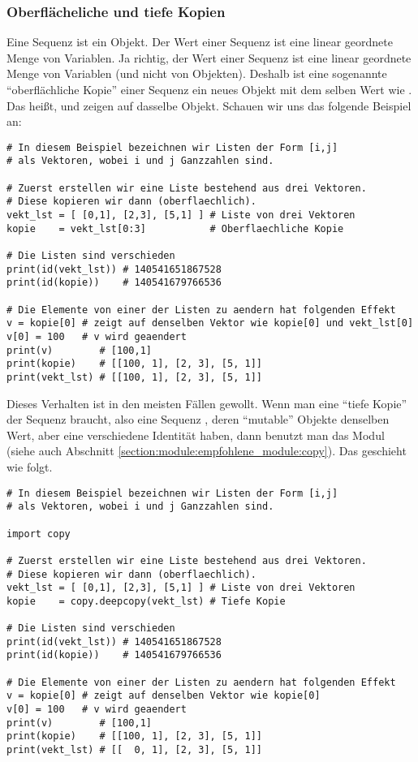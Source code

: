 \subsubsection{Oberflächeliche und tiefe Kopien}
\label{section:std_data_types:sequenzen:kopien}
Eine Sequenz ist ein Objekt.
Der Wert einer Sequenz ist eine linear geordnete Menge von Variablen.
Ja richtig, der Wert einer Sequenz ist eine linear geordnete Menge von Variablen (und nicht von Objekten).
Deshalb ist eine sogenannte ``oberflächliche Kopie'' einer Sequenz  ein neues Objekt  mit dem selben Wert wie .
Das heißt,  und  zeigen auf dasselbe Objekt.
Schauen wir uns das folgende Beispiel an:
\begin{lstlisting}
# In diesem Beispiel bezeichnen wir Listen der Form [i,j]
# als Vektoren, wobei i und j Ganzzahlen sind.

# Zuerst erstellen wir eine Liste bestehend aus drei Vektoren.
# Diese kopieren wir dann (oberflaechlich).
vekt_lst = [ [0,1], [2,3], [5,1] ] # Liste von drei Vektoren
kopie    = vekt_lst[0:3]           # Oberflaechliche Kopie

# Die Listen sind verschieden
print(id(vekt_lst)) # 140541651867528
print(id(kopie))    # 140541679766536

# Die Elemente von einer der Listen zu aendern hat folgenden Effekt
v = kopie[0] # zeigt auf denselben Vektor wie kopie[0] und vekt_lst[0]
v[0] = 100   # v wird geaendert
print(v)        # [100,1]
print(kopie)    # [[100, 1], [2, 3], [5, 1]]
print(vekt_lst) # [[100, 1], [2, 3], [5, 1]]
\end{lstlisting}

Dieses Verhalten ist in den meisten Fällen gewollt.
Wenn man eine ``tiefe Kopie'' der Sequenz  braucht, also eine Sequenz ,
deren ``mutable'' Objekte denselben Wert, aber eine verschiedene Identität haben, dann benutzt man das Modul 
(siehe auch Abschnitt \ref{section:module:empfohlene_module:copy}).
Das geschieht wie folgt.
\begin{lstlisting}
# In diesem Beispiel bezeichnen wir Listen der Form [i,j]
# als Vektoren, wobei i und j Ganzzahlen sind.

import copy

# Zuerst erstellen wir eine Liste bestehend aus drei Vektoren.
# Diese kopieren wir dann (oberflaechlich).
vekt_lst = [ [0,1], [2,3], [5,1] ] # Liste von drei Vektoren
kopie    = copy.deepcopy(vekt_lst) # Tiefe Kopie

# Die Listen sind verschieden
print(id(vekt_lst)) # 140541651867528
print(id(kopie))    # 140541679766536

# Die Elemente von einer der Listen zu aendern hat folgenden Effekt
v = kopie[0] # zeigt auf denselben Vektor wie kopie[0]
v[0] = 100   # v wird geaendert
print(v)        # [100,1]
print(kopie)    # [[100, 1], [2, 3], [5, 1]]
print(vekt_lst) # [[  0, 1], [2, 3], [5, 1]]
\end{lstlisting}


